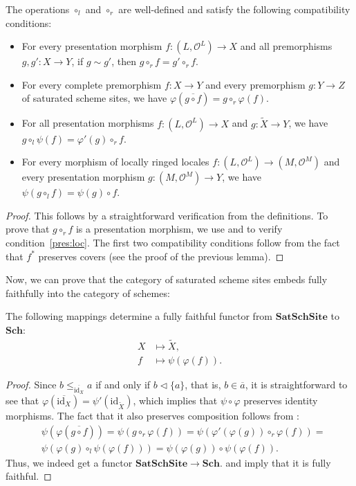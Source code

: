\documentclass[reqno]{amsart}
\theoremstyle{definition}
\theoremstyle{remark}
\numberwithin{figure}{section}
\newcommand{\cover}{\triangleleft}
\newcommand{\cat}[1]{\mathbf{#1}}
\begin{document}
\begin{lem}
The operations $\circ_l$ and $\circ_r$ are well-defined and satisfy the following compatibility conditions:
\begin{itemize}
\item For every presentation morphism $f : (L,\mathcal{O}^L) \to X$ and all premorphisms $g,g' : X \to Y$, if $g \sim g'$, then $g \circ_r f = g' \circ_r f$.
\item For every complete premorphism $f : X \to Y$ and every premorphism $g : Y \to Z$ of saturated scheme sites, we have $\varphi(\overline{g \circ f}) = g \circ_r \varphi(f)$.
\item For all presentation morphisms $f : (L,\mathcal{O}^L) \to X$ and $g : \widetilde{X} \to Y$, we have $g \circ_l \psi(f) = \varphi'(g) \circ_r f$.
\item For every morphism of locally ringed locales $f : (L,\mathcal{O}^L) \to (M,\mathcal{O}^M)$ and every presentation morphism $g : (M,\mathcal{O}^M) \to Y$, we have $\psi(g \circ_l f) = \psi(g) \circ f$.
\end{itemize}
\end{lem}
\begin{proof}
This follows by a straightforward verification from the definitions.
To prove that $g \circ_r f$ is a presentation morphism, we use  and  to verify condition~\eqref{pres:loc}.
The first two compatibility conditions follow from the fact that $f^*$ preserves covers (see the proof of the previous lemma).
\end{proof}

Now, we can prove that the category of saturated scheme sites embeds fully faithfully into the category of schemes:

\begin{prop}[fff]
The following mappings determine a fully faithful functor from $\cat{SatSchSite}$ to $\cat{Sch}$:
\begin{align*}
X & \mapsto \widetilde{X}, \\
f & \mapsto \psi(\varphi(f)).
\end{align*}
\end{prop}
\begin{proof}
Since $b \leq_{\overline{\mathrm{id}_X}} a$ if and only if $b \cover \{ a \}$, that is, $b \in \overline{a}$, it is straightforward to see that $\varphi(\overline{\mathrm{id}_X}) = \psi'(\mathrm{id}_{\widetilde{X}})$, which implies that $\psi \circ \varphi$ preserves identity morphisms.
The fact that it also preserves composition follows from :
\begin{align*}
& \psi(\varphi(\overline{g \circ f})) = \psi(g \circ_r \varphi(f)) = \psi(\varphi'(\varphi(g)) \circ_r \varphi(f)) = \\
& \psi(\varphi(g) \circ_l \psi(\varphi(f))) = \psi(\varphi(g)) \circ \psi(\varphi(f)).
\end{align*}
Thus, we indeed get a functor $\cat{SatSchSite} \to \cat{Sch}$.
 and  imply that it is fully faithful.
\end{proof}
\end{document}
